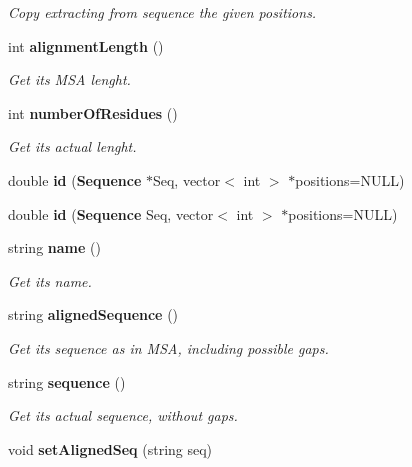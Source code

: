 \begin{CompactItemize}
\begin{CompactList}\small\item\em Copy extracting from sequence the given positions. \item\end{CompactList}\item 
int {\bf alignment\-Length} ()\label{classSequence_a6}

\begin{CompactList}\small\item\em Get its MSA lenght. \item\end{CompactList}\item 
int {\bf number\-Of\-Residues} ()\label{classSequence_a7}

\begin{CompactList}\small\item\em Get its actual lenght. \item\end{CompactList}\item 
double {\bf id} ({\bf Sequence} $\ast$Seq, vector$<$ int $>$ $\ast$positions=NULL)
\item 
double {\bf id} ({\bf Sequence} Seq, vector$<$ int $>$ $\ast$positions=NULL)\label{classSequence_a9}

\item 
string {\bf name} ()\label{classSequence_a10}

\begin{CompactList}\small\item\em Get its name. \item\end{CompactList}\item 
string {\bf aligned\-Sequence} ()\label{classSequence_a11}

\begin{CompactList}\small\item\em Get its sequence as in MSA, including possible gaps. \item\end{CompactList}\item 
string {\bf sequence} ()\label{classSequence_a12}

\begin{CompactList}\small\item\em Get its actual sequence, without gaps. \item\end{CompactList}\item 
void {\bf set\-Aligned\-Seq} (string seq)\label{classSequence_a13}


\end{CompactItemize}
